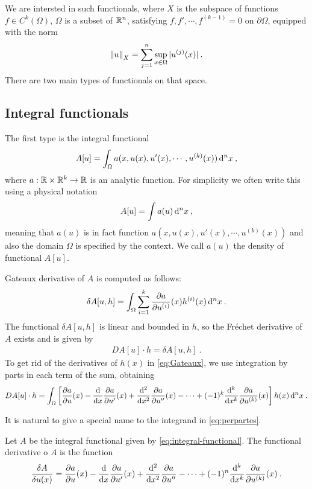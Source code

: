 We are intersted in such functionals, where $X$ is the subspace of functions $ f \in C^k(\Omega)$, $\Omega$ is a subset of $\mathbb{R}^n$, satisfying $f,f',\cdots,f^{(k-1)} = 0$ on $\partial \Omega$, equipped with the norm
\begin{align}
    \left \Vert u \right \Vert_X = \sum_{j=1}^n \sup_{x \in \Omega} |u^{(j)}(x)| \:.
\end{align}
There are two main types of functionals on that space. 

\subsection{Integral functionals}

The first type is the integral functional
\begin{align}
    A[u] = \int_\Omega a(x,u(x),u'(x),\cdots,u^{(k)}(x)) \, \mathrm{d}^n x \:, \label{eq:integral-functional}
\end{align}
where $a : \mathbb{R} \times \mathbb{R}^{k} \to \mathbb{R}$ is an analytic function.
For simplicity we often write this using a physical notation
\begin{align}
    A[u] = \int a(u) \, \mathrm{d}^n x \:,
\end{align}
meaning that $a(u)$ is in fact function $a(x,u(x),u'(x),\cdots, u^{(k)}(x))$ and also the domain $\Omega$ is specified by the context. We call $a(u)$ the density of functional $A[u]$.

Gateaux derivative of $A$ is computed as follows:
\begin{align}
    \delta A[u,h] = \int_\Omega \sum_{i=1}^k \frac{\partial a}{\partial u^{(i)}}(x) h^{(i)}(x) \, \mathrm{d}^n x \:. \label{eq:Gateaux}
\end{align}
The functional $\delta A[u,h]$ is linear and bounded in $h$, so the Fréchet derivative of $A$ exists and is given by
\begin{align}
    DA[u] \cdot h = \delta A[u,h] \:.
\end{align}
To get rid of the derivatives of $h(x)$ in \eqref{eq:Gateaux}, we use integration by parts in each term of the sum, obtaining
\begin{align}
    DA[u] \cdot h = \int_\Omega \left[ \frac{\partial a}{\partial u}(x) - \frac{\mathrm{d}}{\mathrm{d}x} \frac{\partial a}{\partial u'}(x) + \frac{\mathrm{d}^2}{\mathrm{d}x^2} \frac{\partial a}{\partial u''}(x) - \cdots + (-1)^k \frac{\mathrm{d}^k}{\mathrm{d}x^k} \frac{\partial a}{\partial u^{(k)}}(x) \right] h(x) \, \mathrm{d}^n x \:. \label{eq:perpartes}
\end{align}

It is natural to give a special name to the integrand in \eqref{eq:perpartes}.

\begin{definition}
    Let $A$ be the integral functional given by \eqref{eq:integral-functional}. The functional derivative o $A$ is the function
    \begin{align}
        \frac{\delta A}{\delta u(x)} = \frac{\partial a}{\partial u}(x) - \frac{\mathrm{d}}{\mathrm{d}x} \frac{\partial a}{\partial u'}(x) + \frac{\mathrm{d}^2}{\mathrm{d}x^2} \frac{\partial a}{\partial u''} - \cdots + (-1)^n \frac{\mathrm{d}^k}{\mathrm{d}x^k} \frac{\partial a}{\partial u^{(k)}}(x) \:.
    \end{align}
\end{definition}

